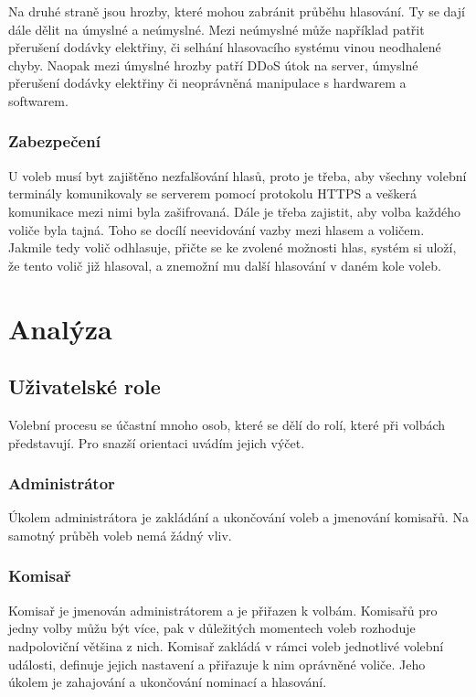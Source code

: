 \documentclass[11pt,twoside,a4paper]{book}
\begin{document}
Na druhé straně jsou hrozby, které mohou zabránit průběhu hlasování. Ty se dají dále dělit na úmyslné a neúmyslné. Mezi neúmyslné může například patřit přerušení dodávky elektřiny, či selhání hlasovacího systému vinou neodhalené chyby. Naopak mezi úmyslné hrozby patří DDoS útok \cite{www:ddos} na server, úmyslné přerušení dodávky elektřiny či neoprávněná manipulace s hardwarem a softwarem.

\subsection{Zabezpečení}

U voleb musí byt zajištěno nezfalšování hlasů, proto je třeba, aby všechny volební terminály komunikovaly se serverem pomocí protokolu HTTPS a veškerá komunikace mezi nimi byla zašifrovaná. Dále je třeba zajistit, aby volba každého voliče byla tajná. Toho se docílí neevidování vazby mezi hlasem a voličem. Jakmile tedy volič odhlasuje, přičte se ke zvolené možnosti hlas, systém si uloží, že tento volič již hlasoval, a znemožní mu další hlasování v daném kole voleb.

\chapter{Analýza}

\section{Uživatelské role}

Volební procesu se účastní mnoho osob, které se dělí do rolí, které při volbách představují. Pro snazší orientaci uvádím jejich výčet.

\subsection{Administrátor}

Úkolem administrátora je zakládání a ukončování voleb a jmenování komisařů. Na samotný průběh voleb nemá žádný vliv. 

\subsection{Komisař}

Komisař je jmenován administrátorem a je přiřazen k volbám. Komisařů pro jedny volby můžu být více, pak v důležitých momentech voleb rozhoduje nadpoloviční většina z nich. Komisař zakládá v rámci voleb jednotlivé volební události, definuje jejich nastavení a přiřazuje k nim oprávněné voliče. Jeho úkolem je zahajování a ukončování nominací a hlasování.
\end{document}
